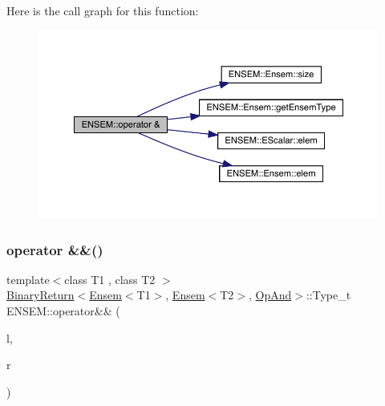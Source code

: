 Here is the call graph for this function\+:\nopagebreak
\begin{figure}[H]
\begin{center}
\leavevmode
\includegraphics[width=350pt]{d1/d9e/group__eensem_ga81252fa8c928f420f2676e632c49a421_cgraph}
\end{center}
\end{figure}
\mbox{\label{group__eensem_ga1a9761f53df3f59110335a2a8cf2d67c}} 
\subsubsection{\texorpdfstring{operator \&\&()}{operator \&\&()}\hspace{0.1cm}{\footnotesize\ttfamily [1/3]}}
{\footnotesize\ttfamily template$<$class T1 , class T2 $>$ \\
\mbox{\hyperlink{structENSEM_1_1BinaryReturn}{Binary\+Return}}$<$\mbox{\hyperlink{classENSEM_1_1Ensem}{Ensem}}$<$T1$>$, \mbox{\hyperlink{classENSEM_1_1Ensem}{Ensem}}$<$T2$>$, \mbox{\hyperlink{structENSEM_1_1OpAnd}{Op\+And}}$>$\+::Type\+\_\+t E\+N\+S\+E\+M\+::operator\&\& (\begin{DoxyParamCaption}\item[{const \mbox{\hyperlink{classENSEM_1_1Ensem}{Ensem}}$<$ T1 $>$ \&}]{l,  }\item[{const \mbox{\hyperlink{classENSEM_1_1Ensem}{Ensem}}$<$ T2 $>$ \&}]{r }\end{DoxyParamCaption})\hspace{0.3cm}{\ttfamily [inline]}}

